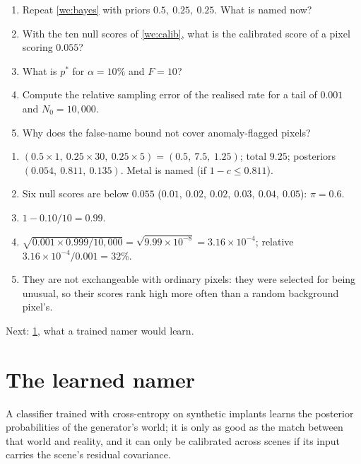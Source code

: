 \documentclass[11pt,a4paper,oneside,openany]{book}
\newcommand{\nextchapter}[1]{\par\medskip\noindent\hfill\textsf{\small Next: #1}\par}
\begin{document}
\begin{checkyourself}
\begin{enumerate}
\item Repeat \cref{we:bayes} with priors $0.5,\ 0.25,\ 0.25$. What is named now?
\item With the ten null scores of \cref{we:calib}, what is the calibrated score of a pixel scoring $0.055$?
\item What is $p^\ast$ for $\alpha=10\%$ and $F=10$?
\item Compute the relative sampling error of the realised rate for a tail of $0.001$ and $N_0=10{,}000$.
\item Why does the false-name bound not cover anomaly-flagged pixels?
\end{enumerate}
\end{checkyourself}

\begin{answers}
\begin{enumerate}
\item $(0.5\times1,\ 0.25\times30,\ 0.25\times5)=(0.5,\ 7.5,\ 1.25)$; total $9.25$; posteriors $(0.054,\ 0.811,\ 0.135)$. Metal is named (if $1-c\le0.811$).
\item Six null scores are below $0.055$ ($0.01,\ 0.02,\ 0.02,\ 0.03,\ 0.04,\ 0.05$): $\pi=0.6$.
\item $1-0.10/10=0.99$.
\item $\sqrt{0.001\times0.999/10{,}000}=\sqrt{9.99\times10^{-8}}=3.16\times10^{-4}$; relative $3.16\times10^{-4}/0.001=32\%$.
\item They are not exchangeable with ordinary pixels: they were selected for being unusual, so their scores rank high more often than a random background pixel's.
\end{enumerate}
\end{answers}

\nextchapter{\cref{ch:namer}, what a trained namer would learn.}

\chapter{The learned namer}
\label{ch:namer}

\begin{onething}
A classifier trained with cross-entropy on synthetic implants learns the posterior probabilities of the generator's world; it is only as good as the match between
that world and reality, and it can only be calibrated across scenes if its input carries the scene's residual covariance.
\end{onething}
\end{document}
